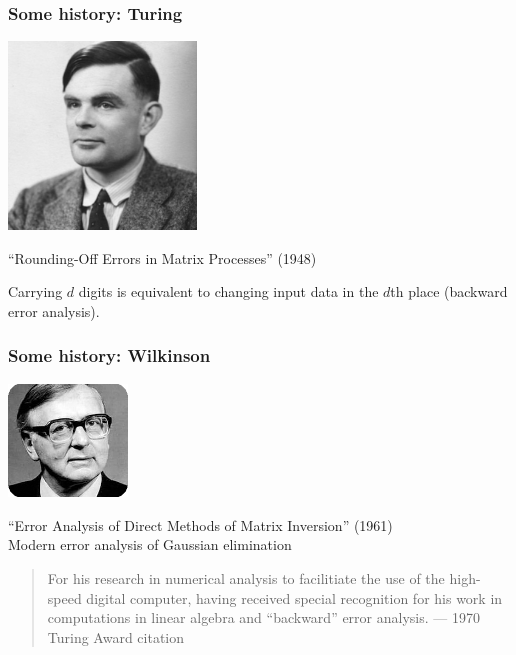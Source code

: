 \documentclass{beamer}
\begin{document}
\begin{frame}
  \frametitle{Some history: Turing}
  
  \begin{center}
    \includegraphics[height=5cm]{figs/turing.jpg}

    {\small ``Rounding-Off Errors in Matrix Processes'' (1948)}
  \end{center}

  Carrying $d$ digits is equivalent to changing input
  data in the $d$th place (backward error analysis).
\end{frame}


\begin{frame}
  \frametitle{Some history: Wilkinson}
  
  \begin{center}
    \includegraphics[height=3cm]{figs/wilkinson.jpg}

    {\small ``Error Analysis of Direct Methods of Matrix
    Inversion'' (1961) \\ Modern error analysis of Gaussian elimination}
  \end{center}

  \begin{quote}
    For his research in numerical analysis to facilitiate the use of
    the high-speed digital computer, having received special
    recognition for his work in computations in linear algebra and
    ``backward'' error analysis. \hfill --- 1970 Turing Award citation
  \end{quote}
\end{frame}
\end{document}
